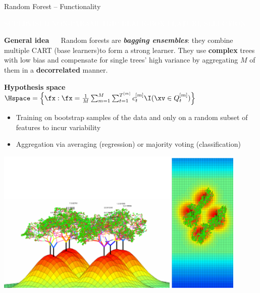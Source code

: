 \documentclass[11pt,compress,t,notes=noshow, xcolor=table]{beamer}
\newcommand{\bfit}[1]{\textbf{\textit{#1}}}
\newcommand{\maketag}[1]{\colorbox{highlightcol}{\textcolor{white}
{\MakeUppercase{#1}}}}
\newcommand{\highlight}[1]{\textcolor{highlightcol}{\textbf{#1}}}
\begin{document}
\begin{frame}{Random Forest -- Functionality}

\footnotesize

\maketag{SUPERVISED}
\maketag{NON-PARAMETRIC} 
\maketag{BLACK-BOX}
\maketag{FEATURE SELECTION}

\medskip

\highlight{General idea} ~~ Random forests are 
\bfit{bagging ensembles}: they combine multiple CART (base learners)to form a 
strong learner. They use \textbf{complex} trees with low  bias and compensate 
for single trees' high variance by aggregating $M$ of them in a 
\textbf{decorrelated} manner. 

\medskip

\highlight{Hypothesis space} ~~
$\Hspace = \left\{ \fx: \fx = \frac{1}{M} \sum_{m = 1}^M \sum_{t = 1}^{T^{[m]}} 
c_t^{[m]} \I(\xv \in Q_t^{[m]}) \right\}$

\medskip

\begin{minipage}{0.6\textwidth}
  \begin{itemize}
    \item Training on bootstrap samples of the data and only on a random subset 
    of features to incur variability
    \item Aggregation via averaging (regression) or majority voting
    (classification)
  \end{itemize}
\end{minipage}%
\begin{minipage}{0.4\textwidth}
  \includegraphics[width=0.9\textwidth]{figure/rf_3d.PNG}
\end{minipage}

\end{frame}

\end{document}
